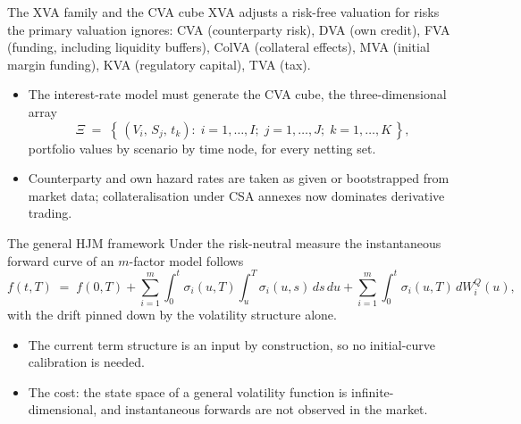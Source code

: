 \documentclass[aspectratio=169,11pt]{beamer}
\begin{document}
\begin{frame}{The XVA family and the CVA cube}
  \small XVA adjusts a risk-free valuation for risks the primary valuation
  ignores: CVA (counterparty risk), DVA (own credit), FVA (funding,
  including liquidity buffers), ColVA (collateral effects), MVA (initial
  margin funding), KVA (regulatory capital), TVA (tax).
  \begin{itemize}
    \item The interest-rate model must generate the CVA cube, the
          three-dimensional array
          \[ \Xi \;=\; \left\{\,(V_i,\,S_j,\,t_k):\;
             i=1,\dots,I;\; j=1,\dots,J;\; k=1,\dots,K \,\right\}, \]
          portfolio values by scenario by time node, for every netting set.
    \item Counterparty and own hazard rates are taken as given or
          bootstrapped from market data; collateralisation under CSA
          annexes now dominates derivative trading.
  \end{itemize}
\end{frame}

\begin{frame}{The general HJM framework}
  \small Under the risk-neutral measure the instantaneous forward curve of
  an $m$-factor model follows
  \[ f(t,T) \;=\; f(0,T)
     + \sum_{i=1}^{m}\int_0^{t}\!\sigma_i(u,T)\!\int_u^{T}\!\sigma_i(u,s)\,ds\,du
     + \sum_{i=1}^{m}\int_0^{t}\!\sigma_i(u,T)\,dW^{Q}_i(u), \]
  with the drift pinned down by the volatility structure alone.
  \begin{itemize}
    \item The current term structure is an input by construction, so no
          initial-curve calibration is needed.
    \item The cost: the state space of a general volatility function is
          infinite-dimensional, and instantaneous forwards are not observed
          in the market.
  \end{itemize}
\end{frame}
\end{document}
